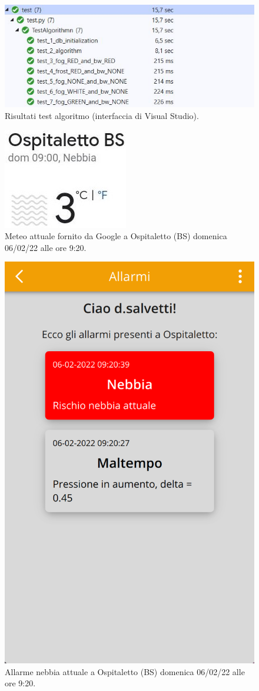 \begin{figure}[h!]
	\centering
	\includegraphics[width=1\linewidth]{./Iterazione 3/ImageFiles/TestResultAlgorithm}
	\caption{Risultati test algoritmo (interfaccia di Visual Studio).}
	\label{fig:test_result_alg}
\end{figure}

\UseRawInputEncoding


\begin{figure}[h!]
	\centering
	\includegraphics[width=0.2\linewidth]{./Iterazione 3/ImageFiles/Nebbia Ospitaletto Google}
	\caption{Meteo attuale fornito da Google a Ospitaletto (BS) domenica 06/02/22 alle ore 9:20.}
	\label{fig:test_previsione}
\end{figure}

\begin{figure}[h!]
	\centering
	\includegraphics[width=0.3\linewidth]{./Iterazione 3/ImageFiles/testAppRedFog}
	\caption{Allarme nebbia attuale a Ospitaletto (BS) domenica 06/02/22 alle ore 9:20.}
	\label{fig:test_previsione}
\end{figure}

